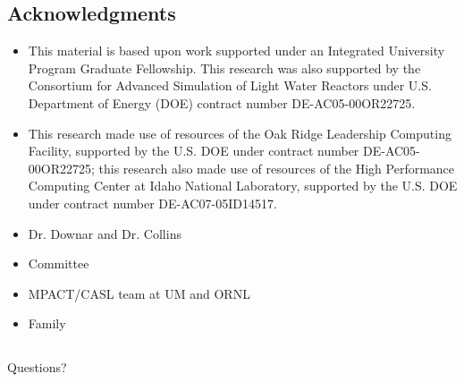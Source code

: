 
\subsection{Acknowledgments}
\begin{frame}

\footnotesize
\begin{itemize}
    \item This material is based upon work supported under an Integrated University Program Graduate Fellowship.  This research was also supported by the Consortium for Advanced Simulation of Light Water Reactors under U.S. Department of Energy (DOE) contract number DE-AC05-00OR22725.
    \item This research made use of resources of the Oak Ridge Leadership Computing Facility, supported by the U.S. DOE under contract number DE-AC05-00OR22725; this research also made use of resources of the High Performance Computing Center at Idaho National Laboratory, supported by the U.S. DOE under contract number DE-AC07-05ID14517.
    \item Dr. Downar and Dr. Collins
    \item Committee
    \item MPACT/CASL team at UM and ORNL
    \item Family
\end{itemize}

\end{frame}


\subsection*{ }
\begin{frame}
    
\vfill
\begin{center}
    \Large Questions?
\end{center}
\vfill

\end{frame}
